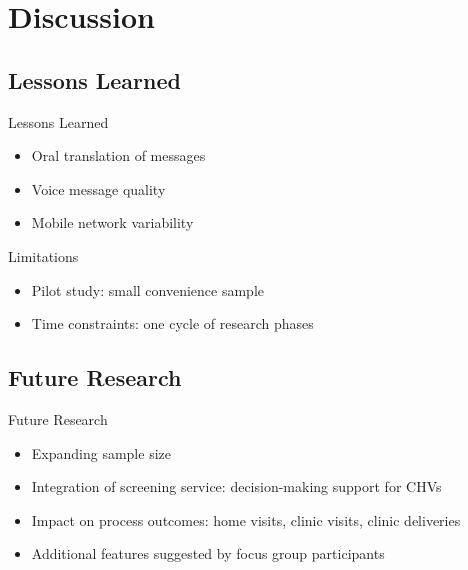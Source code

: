 \documentclass[xcolor=x11names,compress]{beamer}
\renewcommand{\(}{\begin{columns}}
\renewcommand{\)}{\end{columns}}
\newcommand{\<}[1]{\begin{column}{#1}}
\renewcommand{\>}{\end{column}}
\begin{document}
\section{Discussion}
\subsection{Lessons Learned}
\begin{frame}{Lessons Learned}
\begin{itemize}
\item{Oral translation of messages}
\item{Voice message quality}
\item{Mobile network variability}
\end{itemize}
\end{frame}

\begin{frame}{Limitations}
\begin{itemize}
\item{Pilot study: small convenience sample}
\item{Time constraints: one cycle of research phases}
\end{itemize}
\end{frame}

\subsection{Future Research}
\begin{frame}{Future Research}
\begin{itemize}
\item{Expanding sample size}
\item{Integration of screening service: decision-making support for CHVs}
\item{Impact on process outcomes: home visits, clinic visits, clinic deliveries}
\item{Additional features suggested by focus group participants}
\end{itemize}
\end{frame}
\end{document}
